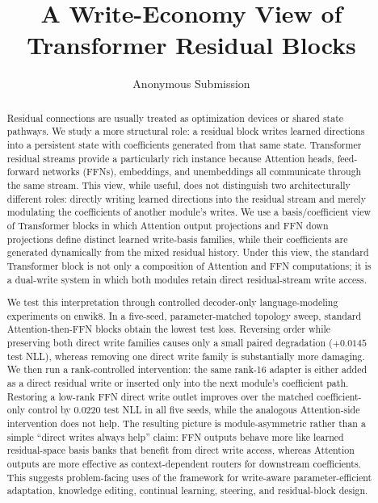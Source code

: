 \documentclass[letterpaper]{article}
\title{A Write-Economy View of Transformer Residual Blocks}
\author{
    Anonymous Submission
}
\begin{document}
\maketitle

\begin{abstract}
Residual connections are usually treated as optimization devices or shared
state pathways. We study a more structural role: a residual block writes
learned directions into a persistent state with coefficients generated from
that same state. Transformer residual streams provide a particularly rich
instance because Attention heads, feed-forward networks (FFNs), embeddings, and
unembeddings all communicate through the same stream. This view, while useful,
does not distinguish two architecturally different roles: directly writing
learned directions into the residual stream and merely modulating the
coefficients of another module's writes. We use a basis/coefficient view
of Transformer blocks in which Attention output projections and FFN down
projections define distinct learned write-basis families, while their
coefficients are generated dynamically from the mixed residual history. Under
this view, the standard Transformer block is not only a composition of
Attention and FFN computations; it is a dual-write system in which both modules
retain direct residual-stream write access.

We test this interpretation through controlled decoder-only language-modeling
experiments on enwik8. In a five-seed, parameter-matched topology sweep,
standard Attention-then-FFN blocks obtain the lowest test loss. Reversing order
while preserving both direct write families causes only a small paired
degradation ($+0.0145$ test NLL), whereas removing one direct write family is
substantially more damaging. We then run a rank-controlled intervention: the
same rank-16 adapter is either added as a direct residual write or inserted
only into the next module's coefficient path. Restoring a low-rank FFN direct
write outlet improves over the matched coefficient-only control by $0.0220$
test NLL in all five seeds, while the analogous Attention-side intervention
does not help. The resulting picture is module-asymmetric rather than a simple
``direct writes always help'' claim: FFN outputs behave more like learned
residual-space basis banks that benefit from direct write access, whereas
Attention outputs are more effective as context-dependent routers for
downstream coefficients. This suggests problem-facing uses of the framework for
write-aware parameter-efficient adaptation, knowledge editing, continual
learning, steering, and residual-block design.
\end{abstract}
\end{document}
